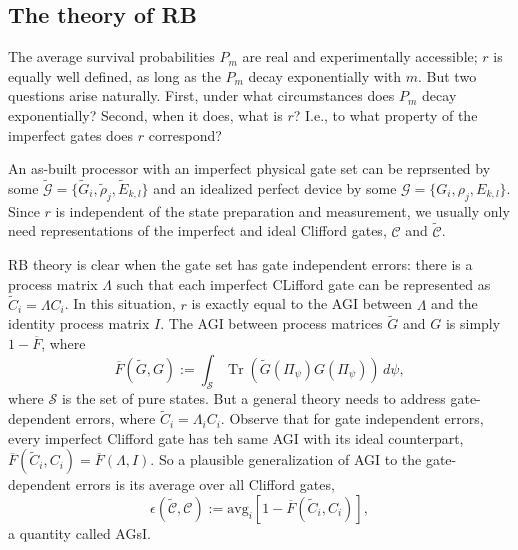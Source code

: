\documentclass[a4paper]{article}
\DeclareMathOperator{\Tr}{Tr}
\begin{document}
    \subsection{The theory of RB}

    The average survival probabilities $P_m$ are real and
    experimentally accessible; $r$ is equally well defined,
    as long as the $P_m$ decay exponentially with $m$. But
    two questions arise naturally. First, under what
    circumstances does $P_m$ decay exponentially? Second,
    when it does, what is $r$? I.e., to what property of the
    imperfect gates does $r$ correspond?

    An as-built processor with an imperfect physical gate
    set can be reprsented by some $\tilde{\mathcal{G}} =
    \{\tilde G_i, \tilde \rho_j, \tilde E_{k,l}\}$ and an
    idealized perfect device by some $\mathcal{G} = \{G_i,
    \rho_j, E_{k,l}\}$. Since $r$ is independent of the
    state preparation and measurement, we usually only need
    representations of the imperfect and ideal Clifford
    gates, $\mathcal{C}$ and $\tilde{\mathcal{C}}$.

    RB theory is clear when the gate set has gate
    independent errors: there is a process matrix $\Lambda$ 
    such that each imperfect CLifford gate can be
    represented as $\tilde C_i = \Lambda C_i$. In this
    situation, $r$ is exactly equal to the AGI between
    $\Lambda$ and the identity process matrix $I$. The AGI
    between process matrices $\tilde G$ and $G$ is simply $1
    - \overline{F}$, where
    \begin{equation}
        \overline{F}\left( \tilde G, G \right) 
        := \int_{\mathcal{S}} \Tr\left( \tilde G(\Pi_\psi)
        G(\Pi_\psi) \right) \, d\psi,
    \end{equation}
    where $\mathcal{S}$ is the set of pure states. But a
    general theory needs to address gate-dependent errors,
    where $\tilde C_i = \Lambda_i C_i$. Observe that for
    gate independent errors, every imperfect Clifford gate
    has teh same AGI with its ideal counterpart,
    $\overline{F}(\tilde C_i, C_i) = \overline{F}(\Lambda,
    I)$. So a plausible generalization of AGI to the
    gate-dependent errors is its average over all Clifford
    gates,
    \begin{equation}
        \epsilon(\tilde{\mathcal{C}}, \mathcal{C})
        := \text{avg}_i [1 - \overline{F}(\tilde C_i, C_i)],
    \end{equation}
    a quantity called AGsI.
\end{document}
